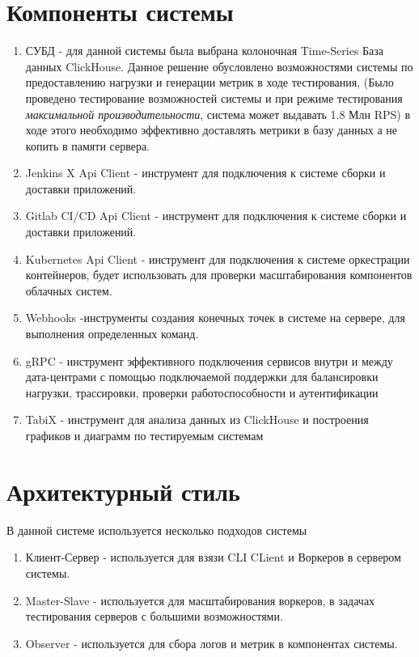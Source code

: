 \documentclass[PI,LAB]{HSEUniversity}
\begin{document}
\section {Компоненты системы}
\begin{enumerate}
	\item СУБД - для данной системы была выбрана колоночная Time-Series База данных ClickHouse. Данное решение обусловлено  возможностями системы по предоставлению нагрузки и генерации метрик в ходе тестирования, (Было проведено  тестирование возможностей системы и при режиме тестирования \emph{максимальной производительности}, система может выдавать 1.8 Млн RPS) в ходе этого необходимо эффективно доставлять метрики в базу данных а не копить в памяти сервера.
	\item Jenkins X Api Client - инструмент для подключения к  системе сборки и доставки приложений.
	\item  Gitlab CI/CD  Api Client - инструмент для подключения к  системе сборки и доставки приложений.
	\item Kubernetes Api Client - инструмент для подключения к системе оркестрации контейнеров, будет использовать для проверки масштабирования компонентов облачных систем.
	\item Webhooks -инструменты создания конечных точек в системе на сервере, для выполнения определенных команд.
	\item gRPC - инструмент эффективного подключения сервисов внутри и между дата-центрами с помощью подключаемой поддержки для балансировки нагрузки, трассировки, проверки работоспособности и аутентификации
	\item TabiX - инструмент для анализа данных из ClickHouse и построения графиков и диаграмм по тестируемым системам
	\end{enumerate}

\section {Архитектурный стиль}
В данной системе используется несколько подходов системы
\begin{enumerate}
	\item Клиент-Сервер - используется для взязи CLI CLient и Воркеров в сервером системы.
	 \item Master-Slave - используется для масштабирования воркеров, в задачах тестирования серверов с большими возможностями.
	 \item Observer - используется для сбора логов и метрик в компонентах системы.
\end{enumerate}
\end{document}
